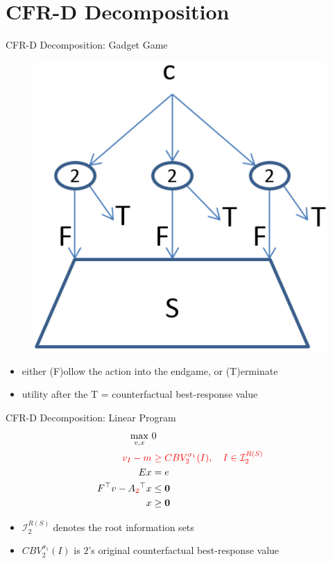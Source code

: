 \documentclass{beamer}
\theoremstyle{definition}
\newcommand{\vect}[1]{\boldsymbol{#1}}
\newcommand{\I}{\mathcal{I}}
\begin{document}
  \section{CFR-D Decomposition}
  {
    \begin{frame}{CFR-D Decomposition: Gadget Game}
      \begin{figure}[H]
        \centering
        \includegraphics[width=.4\textwidth]{../img/re-solving-game-gadget.png}
      \end{figure}
      \pause

      \begin{itemize}[<+- | alert@+>]
        \item either (F)ollow the action into the endgame, or (T)erminate
        \item utility after the T = counterfactual best-response value
      \end{itemize}
    \end{frame}

    \begin{frame}{CFR-D Decomposition: Linear Program}
      \begin{equation*}
        \label{lp:cfr-d}
        \begin{split}
          \max_{v, x}\ &0 \\
          \color{red}
          v_I - m &
          \color{red}
          \ge CBV_2^{\sigma_1}(I), \quad I \in \I_2^{R(S)}\\ 
          Ex &= e \\
          F^\top v - A_{\color{red}2}^\top x &\le \vect{0} \\
          x &\ge \vect{0}
        \end{split}
      \end{equation*}
      \pause

      \begin{itemize}[<+- | alert@+>]
        \item $\I_2^{R(S)}$ denotes the root information sets 
        \item $CBV_2^{\sigma_1}(I)$ is $2$'s original counterfactual best-response value
      \end{itemize}
    \end{frame}
  }
\end{document}
